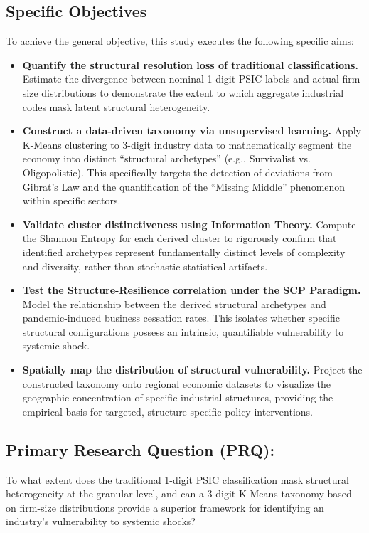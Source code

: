 \documentclass[acmtog, nonacm]{acmart}
\begin{document}
\subsection{Specific Objectives}
To achieve the general objective, this study executes the following specific aims:
\begin{itemize}
    \item \textbf{Quantify the structural resolution loss of traditional classifications.} Estimate the divergence between nominal 1-digit PSIC labels and actual firm-size distributions to demonstrate the extent to which aggregate industrial codes mask latent structural heterogeneity.
    \item \textbf{Construct a data-driven taxonomy via unsupervised learning.} Apply K-Means clustering to 3-digit industry data to mathematically segment the economy into distinct ``structural archetypes'' (e.g., Survivalist vs. Oligopolistic). This specifically targets the detection of deviations from Gibrat's Law and the quantification of the ``Missing Middle'' phenomenon within specific sectors.
    \item \textbf{Validate cluster distinctiveness using Information Theory.} Compute the Shannon Entropy for each derived cluster to rigorously confirm that identified archetypes represent fundamentally distinct levels of complexity and diversity, rather than stochastic statistical artifacts.
    \item \textbf{Test the Structure-Resilience correlation under the SCP Paradigm.} Model the relationship between the derived structural archetypes and pandemic-induced business cessation rates. This isolates whether specific structural configurations possess an intrinsic, quantifiable vulnerability to systemic shock.
    \item \textbf{Spatially map the distribution of structural vulnerability.} Project the constructed taxonomy onto regional economic datasets to visualize the geographic concentration of specific industrial structures, providing the empirical basis for targeted, structure-specific policy interventions.
\end{itemize}

\subsection{Primary Research Question (PRQ):}
To what extent does the traditional 1-digit PSIC classification mask structural heterogeneity at the granular level, and can a 3-digit K-Means taxonomy based on firm-size distributions provide a superior framework for identifying an industry's vulnerability to systemic shocks?
\end{document}
